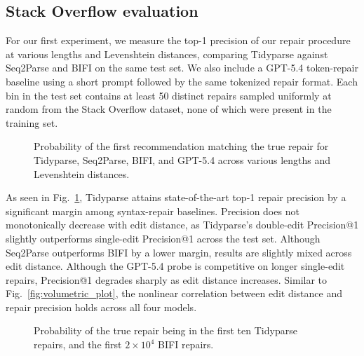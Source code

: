 \documentclass[popl.tex]{subfiles}
\begin{document}
\clearpage\subsection{Stack Overflow evaluation}\label{sec:rq2}

For our first experiment, we measure the top-1 precision of our repair procedure at various lengths and Levenshtein distances, comparing Tidyparse against Seq2Parse and BIFI on the same test set. We also include a GPT-5.4 token-repair baseline using a short prompt followed by the same tokenized repair format. Each bin in the test set contains at least 50 distinct repairs sampled uniformly at random from the Stack Overflow dataset, none of which were present in the training set.\vspace{-0.2cm}

\begin{figure}[h!]
\resizebox{.235\textwidth}{!}{}\hfill
\resizebox{.235\textwidth}{!}{}\hfill
\resizebox{.235\textwidth}{!}{}\hfill
\resizebox{.235\textwidth}{!}{}
\caption{Probability of the first recommendation matching the true repair for Tidyparse, Seq2Parse, BIFI, and GPT-5.4 across various lengths and Levenshtein distances.}\label{fig:len_dist_prec}
\end{figure}\vspace{-0.2cm}

As seen in Fig.~\ref{fig:len_dist_prec}, Tidyparse attains state-of-the-art top-1 repair precision by a significant margin among syntax-repair baselines. Precision does not monotonically decrease with edit distance, as Tidyparse's double-edit Precision@1 slightly outperforms single-edit Precision@1 across the test set. Although Seq2Parse outperforms BIFI by a lower margin, results are slightly mixed across edit distance. Although the GPT-5.4 probe is competitive on longer single-edit repairs, Precision@1 degrades sharply as edit distance increases. Similar to Fig.~\ref{fig:volumetric_plot}, the nonlinear correlation between edit distance and repair precision holds across all four models.

\begin{figure}
\vspace{-0.1cm}
\resizebox{.24\textwidth}{!}{}
\resizebox{.24\textwidth}{!}{}
\caption{Probability of the true repair being in the first ten Tidyparse repairs, and the first $2\times10^4$ BIFI repairs.}\label{fig:len_dist_prec_all}
\vspace{-0.3cm}
\end{figure}
\end{document}
